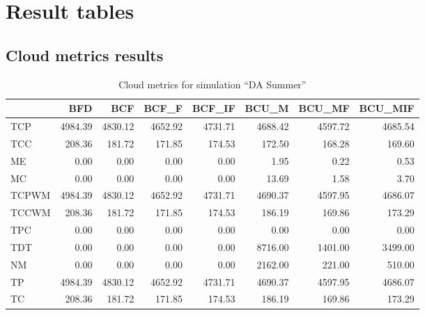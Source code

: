 

\section{Result tables} \label{sec:app_result_simulation_tables}



\subsection{Cloud metrics results}



\begin{table}[ht]
\centering
\begin{tabular}{lrrrrrrr}
\toprule
{} &       BFD &       BCF &     BCF\_F &    BCF\_IF &     BCU\_M &    BCU\_MF &   BCU\_MIF \\
\midrule
TCP   &  4984.39 &  4830.12 &  4652.92 &  4731.71 &  4688.42 &  4597.72 &  4685.54 \\
TCC   &   208.36 &   181.72 &   171.85 &   174.53 &   172.50 &   168.28 &   169.60 \\
ME    &     0.00 &     0.00 &     0.00 &     0.00 &     1.95 &     0.22 &     0.53 \\
MC    &     0.00 &     0.00 &     0.00 &     0.00 &    13.69 &     1.58 &     3.70 \\
TCPWM &  4984.39 &  4830.12 &  4652.92 &  4731.71 &  4690.37 &  4597.95 &  4686.07 \\
TCCWM &   208.36 &   181.72 &   171.85 &   174.53 &   186.19 &   169.86 &   173.29 \\
TPC   &     0.00 &     0.00 &     0.00 &     0.00 &     0.00 &     0.00 &     0.00 \\
TDT   &     0.00 &     0.00 &     0.00 &     0.00 &  8716.00 &  1401.00 &  3499.00 \\
NM    &     0.00 &     0.00 &     0.00 &     0.00 &  2162.00 &   221.00 &   510.00 \\
TP    &  4984.39 &  4830.12 &  4652.92 &  4731.71 &  4690.37 &  4597.95 &  4686.07 \\
TC    &   208.36 &   181.72 &   171.85 &   174.53 &   186.19 &   169.86 &   173.29 \\
\bottomrule
\end{tabular}
\caption{Cloud metrics for simulation "`DA Summer"'}
\end{table}


